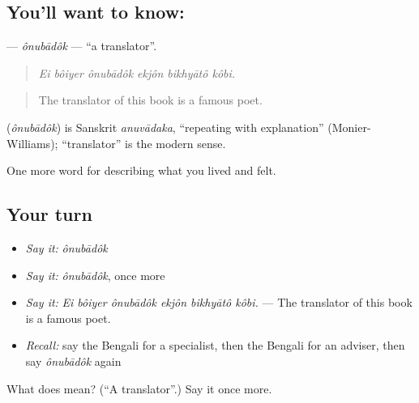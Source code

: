 \subsection*{You'll want to know: }
\textbf{} — \emph{ônubādôk} — \textquotedblleft{}a translator\textquotedblright{}.

\begin{quote}
     
\end{quote}

\begin{quote}
\emph{Ei bôiyer ônubādôk ekjôn bikhyātô kôbi.}
\end{quote}

\begin{quote}
The translator of this book is a famous poet.
\end{quote}

\begin{cousinweb}
\textbf{} (\emph{ônubādôk}) is Sanskrit \emph{anuvādaka}, \textquotedblleft{}repeating with explanation\textquotedblright{} (Monier-Williams); \textquotedblleft{}translator\textquotedblright{} is the modern sense.
\end{cousinweb}

\begin{grammarlens}[title={What you've built}]
One more word for describing what you lived and felt.
\end{grammarlens}

\subsection*{Your turn}
\begin{itemize}
\raggedright
  \item \emph{Say it:} \emph{ônubādôk}
  \item \emph{Say it:} \emph{ônubādôk}, once more
  \item \emph{Say it:} \emph{Ei bôiyer ônubādôk ekjôn bikhyātô kôbi.} — The translator of this book is a famous poet.
  \item \emph{Recall:} say the Bengali for a specialist, then the Bengali for an adviser, then say \emph{ônubādôk} again
\end{itemize}

\begin{tcolorbox}[breakable,colback=teal!4,colframe=teal!35!black,title={Before you move on}]
What does  mean? (\textquotedblleft{}A translator\textquotedblright{}.) Say it once more.
\end{tcolorbox}
